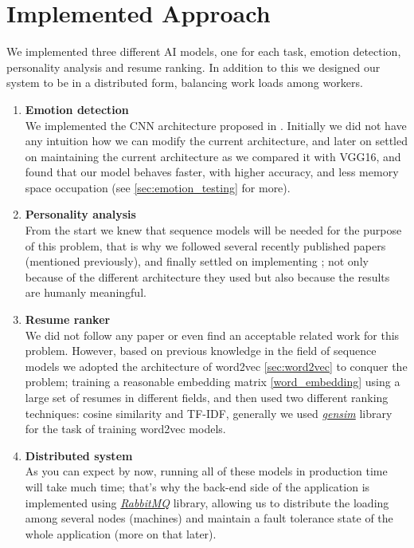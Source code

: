 \newpage

\section{Implemented Approach}
\label{sec:implemented}
We implemented three different AI models, one for each task, emotion detection, personality analysis and resume ranking. In addition to this we designed our system to be in a distributed form, balancing work loads among workers.\\
\begin{enumerate}
    \item\textbf{Emotion detection}\\
    We implemented the CNN architecture proposed in \cite{ariaga}. Initially we did not have any intuition how we can modify the current architecture, and later on settled on maintaining the current architecture as we compared it with VGG16, and found that our model behaves faster, with higher accuracy, and less memory space occupation (see \ref{sec:emotion_testing} for more).
    
    \item\textbf{Personality analysis}\\
    From the start we knew that sequence models will be needed for the purpose of this problem, that is why we followed several recently published papers (mentioned previously), and finally settled on implementing \cite{yash_2}; not only because of the different architecture they used but also because the results are humanly meaningful.
    
    \item \textbf{Resume ranker}\\
    We did not follow any paper or even find an acceptable related work for this problem. However, based on previous knowledge in the field of sequence models we adopted the architecture of word2vec \ref{sec:word2vec} to conquer the problem; training a reasonable embedding matrix \ref{word_embedding} using a large set of resumes in different fields, and then used two different ranking techniques: cosine similarity and TF-IDF, generally we used \href{https://radimrehurek.com/gensim/}{\textit{gensim}} library for the task of training word2vec models.
    
    \item \textbf{Distributed system}\\
    As you can expect by now, running all of these models in production time will take much time; that's why the back-end side of the application is implemented using \href{https://www.rabbitmq.com/}{\textit{RabbitMQ}} library, allowing us to distribute the loading among several nodes (machines) and maintain a fault tolerance state of the whole application (more on that later).
    
\end{enumerate}


